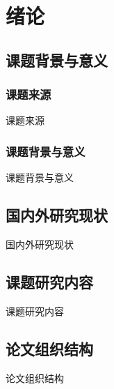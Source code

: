 \chapter{绪论}

\section{课题背景与意义}
\subsection{课题来源}
课题来源
\subsection{课题背景与意义}
课题背景与意义

\section{国内外研究现状}
国内外研究现状

\section{课题研究内容}
课题研究内容

\section{论文组织结构}
论文组织结构

